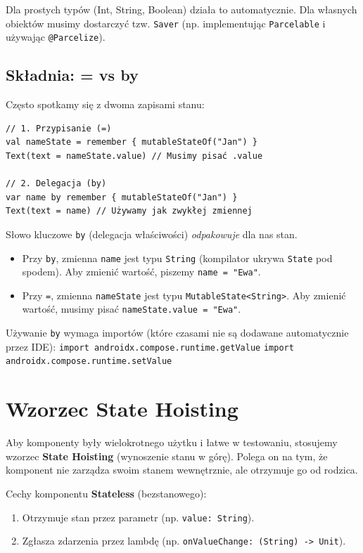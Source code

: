 Dla prostych typów (Int, String, Boolean) działa to automatycznie. Dla własnych obiektów musimy dostarczyć tzw. \texttt{Saver} (np. implementując \texttt{Parcelable} i używając \texttt{@Parcelize}).

\subsection{Składnia: = vs by}
Często spotkamy się z dwoma zapisami stanu:

\begin{verbatim}
// 1. Przypisanie (=)
val nameState = remember { mutableStateOf("Jan") }
Text(text = nameState.value) // Musimy pisać .value

// 2. Delegacja (by)
var name by remember { mutableStateOf("Jan") }
Text(text = name) // Używamy jak zwykłej zmiennej
\end{verbatim}

Słowo kluczowe \texttt{by} (delegacja właściwości) \textit{odpakowuje} dla nas stan.
\begin{itemize}
    \item Przy \texttt{by}, zmienna \texttt{name} jest typu \texttt{String} (kompilator ukrywa \texttt{State} pod spodem). Aby zmienić wartość, piszemy \texttt{name = "Ewa"}.
    \item Przy \texttt{=}, zmienna \texttt{nameState} jest typu \texttt{MutableState<String>}. Aby zmienić wartość, musimy pisać \texttt{nameState.value = "Ewa"}.
\end{itemize}
Używanie \texttt{by} wymaga importów (które czasami nie są dodawane automatycznie przez IDE):
\texttt{import androidx.compose.runtime.getValue}
\texttt{import androidx.compose.runtime.setValue}

\section{Wzorzec State Hoisting}

Aby komponenty były wielokrotnego użytku i łatwe w testowaniu, stosujemy wzorzec \textbf{State Hoisting} (wynoszenie stanu w górę). Polega on na tym, że komponent nie zarządza swoim stanem wewnętrznie, ale otrzymuje go od rodzica.

Cechy komponentu \textbf{Stateless} (bezstanowego):
\begin{enumerate}
    \item Otrzymuje stan przez parametr (np. \texttt{value: String}).
    \item Zgłasza zdarzenia przez lambdę (np. \texttt{onValueChange: (String) -> Unit}).
\end{enumerate}

